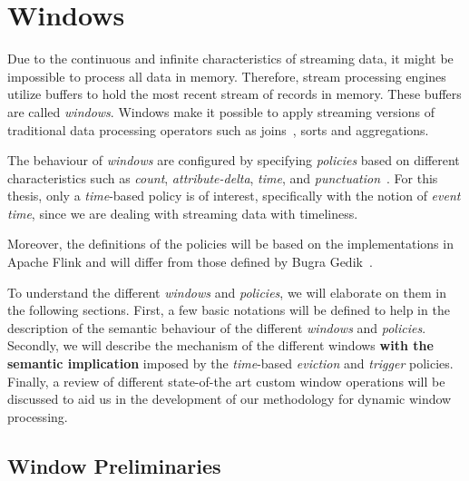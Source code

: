 \chapter{Windows}
\label{chap:windows}

Due to the continuous and infinite characteristics of streaming data, 
it might be impossible to process all data in memory. Therefore, 
stream processing engines utilize buffers to hold the most recent stream of 
records in memory. These buffers are called \emph{windows}. Windows make it 
possible to apply streaming versions of traditional data processing operators such
as joins~\cite{grubjoin}, sorts and aggregations. 

The behaviour of \emph{windows} are configured by specifying \emph{policies}
based on different characteristics such as \emph{count}, \emph{attribute-delta}, \emph{time}, and
\emph{punctuation}~\cite{generic_window_sem}. For this thesis, only a
\emph{time}-based policy is of interest, specifically with the notion of \emph{event time},
since we are dealing with streaming data with 
timeliness.

Moreover, the definitions  of the policies will be based on the 
implementations in Apache Flink and will differ from those defined by 
Bugra Gedik~\cite{generic_window_sem}. 


To understand the different \emph{windows} and \emph{policies}, we will elaborate on them 
in the following sections. First, a few basic notations will be defined to 
help in the description of the semantic behaviour of the different 
\emph{windows} and \emph{policies}. Secondly, we will describe the mechanism of the 
different windows \textbf{with the semantic implication} imposed by the 
\emph{time}-based \emph{eviction} and \emph{trigger} policies. 
Finally, a review of different state-of-the art custom window operations 
will be discussed to aid us in the development of our methodology for 
dynamic window processing. 


\section{Window Preliminaries}%
\label{sec:window_notations}

